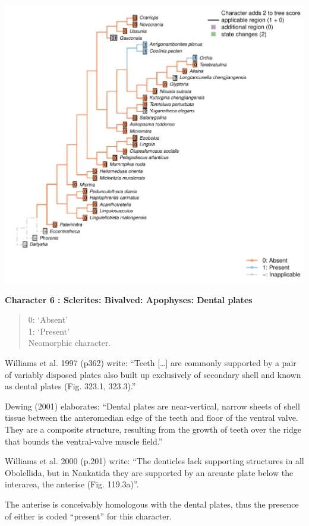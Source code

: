 \documentclass[]{book}
\theoremstyle{definition}
\theoremstyle{definition}
\theoremstyle{definition}
\theoremstyle{remark}
\begin{document}
\includegraphics{Brachiopod_phylogeny_files/figure-latex/unnamed-chunk-5-6.pdf}

\textbf{Character 6 : Sclerites: Bivalved: Apophyses: Dental plates }

\begin{quote}
0: `Absent'\\
1: `Present'\\
Neomorphic character.
\end{quote}

Williams et al. 1997 (p362) write: ``Teeth {[}\ldots{}{]} are commonly
supported by a pair of variably disposed plates also built up
exclusively of secondary shell and known as dental plates (Fig. 323.1,
323.3).''

Dewing (2001) elaborates: ``Dental plates are near-vertical, narrow
sheets of shell tissue between the anteromedian edge of the teeth and
floor of the ventral valve. They are a composite structure, resulting
from the growth of teeth over the ridge that bounds the ventral-valve
muscle field.''

Williams et al. 2000 (p.201) write: ``The denticles lack supporting
structures in all Obolellida, but in Naukatida they are supported by an
arcuate plate below the\\
interarea, the anterise (Fig. 119.3a)''.

The anterise is conceivably homologous with the dental plates, thus the
presence of either is coded ``present'' for this character.
\end{document}
